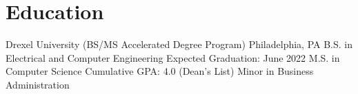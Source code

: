 \section{Education}

\education
  {Drexel University (BS/MS Accelerated Degree Program)}
  {Philadelphia, PA}
  {B.S. in Electrical and Computer Engineering}
  {Expected Graduation: June 2022}
  {M.S. in Computer Science}
  {Cumulative GPA: 4.0 (Dean's List)}
  {Minor in Business Administration}